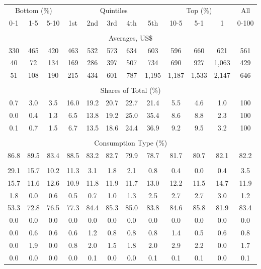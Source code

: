 \begin{tabular}{c c c| c c c c c| c c c| c}
\toprule
\multicolumn{3}{c|}{Bottom (\%)} & \multicolumn{5}{c|}{Quintiles} & \multicolumn{3}{c|}{Top (\%)} & All  \\
0-1 & 1-5 & 5-10 &  1st & 2nd & 3rd & 4th & 5th & 10-5 & 5-1 & 1 & 0-100 \\
\midrule \\
\multicolumn{12}{c}{Averages, US\$} \\
\midrule
330  & 465  & 420  & 463  & 532  & 573  & 634  & 603  & 596  & 660  & 621  & 561 \\
40 & 72 & 134 & 169 & 286 & 397 & 507 & 734 & 690 & 927 & 1,063 & 429 \\
51 & 108 & 190 & 215 & 434 & 601 & 787 & 1,195 & 1,187 & 1,533 & 2,147 & 646 \\
\midrule \\
\multicolumn{12}{c}{Shares of Total (\%)} \\
\midrule
0.7   & 3.0   & 3.5   & 16.0   & 19.2   & 20.7   & 22.7   & 21.4   & 5.5   & 4.6   & 1.0   & 100 \\
0.0  & 0.4  & 1.3  & 6.5  & 13.8  & 19.2  & 25.0  & 35.4  & 8.6  & 8.8  & 2.3  & 100 \\
0.1  & 0.7  & 1.5  & 6.7  & 13.5  & 18.6  & 24.4  & 36.9  & 9.2  & 9.5  & 3.2  & 100 \\
\midrule \\
\multicolumn{12}{c}{Consumption Type (\%)}  \\
\midrule
86.8 & 89.5 & 83.4 & 88.5 & 83.2 & 82.7 & 79.9 & 78.7 & 81.7 & 80.7 & 82.1 & 82.2 \\
 & & & & & & & & & & &  \\
29.1 & 15.7 & 10.2 & 11.3 & 3.1 & 1.8 & 2.1 & 0.8 & 0.4 & 0.0 & 0.4 & 3.5 \\
15.7 & 11.6 & 12.6 & 10.9 & 11.8 & 11.9 & 11.7 & 13.0 & 12.2 & 11.5 & 14.7 & 11.9 \\
1.8 & 0.0 & 0.6 & 0.5 & 0.7 & 1.0 & 1.3 & 2.5 & 2.7 & 2.7 & 3.0 & 1.2 \\
53.3 & 72.8 & 76.5 & 77.3 & 84.4 & 85.3 & 85.0 & 83.8 & 84.6 & 85.8 & 81.9 & 83.4 \\
0.0 & 0.0 & 0.0 & 0.0 & 0.0 & 0.0 & 0.0 & 0.0 & 0.0 & 0.0 & 0.0 & 0.0 \\
0.0 & 0.6 & 0.6 & 0.6 & 1.2 & 0.8 & 0.8 & 0.8 & 1.4 & 0.5 & 0.6 & 0.8 \\
0.0 & 1.9 & 0.0 & 0.8 & 2.0 & 1.5 & 1.8 & 2.0 & 2.9 & 2.2 & 0.0 & 1.7 \\
0.0 & 0.0 & 0.0 & 0.0 & 0.1 & 0.0 & 0.0 & 0.1 & 0.1 & 0.1 & 0.0 & 0.1 \\

\end{tabular}
